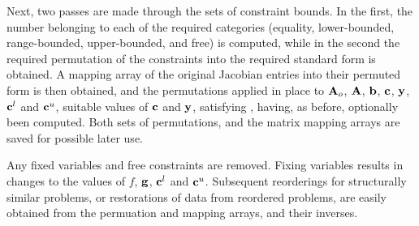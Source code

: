 \documentclass{galahad}
\begin{document}
Next, two passes are made through the sets of constraint bounds. 
In the first, the number belonging to each of the required categories 
(equality, lower-bounded, range-bounded, 
upper-bounded, and free) is computed, while in the 
second the required permutation of the constraints 
into the required standard form is obtained. 
A mapping array of the original Jacobian entries into their 
permuted form is then obtained, and the permutations applied in place 
to ${\mathbf{A}}_o$, ${\mathbf{A}}$, ${\mathbf{b}}$, ${\mathbf{c}}$, ${\mathbf{y}}$, ${\mathbf{c}}^l$ and ${\mathbf{c}}^u$, 
suitable values of ${\mathbf{c}}$ and ${\mathbf{y}}$, satisfying ,
having, as before, optionally been computed. 
Both sets of permutations, and the matrix mapping arrays are saved for 
possible later use. 
 
Any fixed variables and free constraints are removed. Fixing variables 
results in changes to the values of $f$, ${\mathbf{g}}$, ${\mathbf{c}}^l$ and ${\mathbf{c}}^u$. 
Subsequent reorderings for structurally similar problems, or restorations 
of data from reordered problems, 
are easily obtained from the permuation and mapping arrays, and their inverses. 

\end{document}
